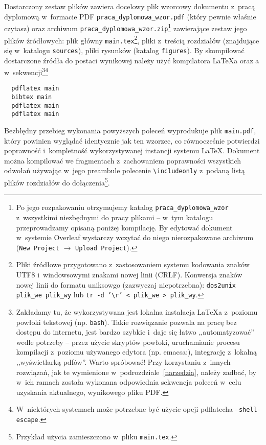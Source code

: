 Dostarczony zestaw plików zawiera docelowy plik wzorcowy dokumentu z~pracą dyplomową w~formacie PDF \texttt{praca\_dyplomowa\_wzor.pdf} (który pewnie właśnie czytasz) oraz archiwum \texttt{praca\_dyplomowa\_wzor.zip}\footnote{Po jego rozpakowaniu otrzymujemy katalog \texttt{praca\_dyplomowa\_wzor} z~wszystkimi niezbędnymi do pracy plikami -- w~tym katalogu przeprowadzamy opisaną poniżej kompilację. By edytować dokument w~systemie Overleaf wystarczy wczytać do niego nierozpakowane archiwum (\texttt{New Project} $\rightarrow$ \texttt{Upload Project}).} zawierające zestaw jego plików źródłowych: plik główny \texttt{main.tex}\footnote{Pliki źródłowe przygotowano z~zastosowaniem systemu kodowania znaków UTF8 i~windowsowymi znakami nowej linii (CRLF). Konwersja znaków nowej linii do formatu uniksowgo (zazwyczaj niepotrzebna): \texttt{dos2unix plik\_we plik\_wy} lub \texttt{tr -d '\textbackslash r' < plik\_we > plik\_wy}.}, pliki z~treścią rozdziałów (znajdujące się w~katalogu \texttt{sources}), pliki rysunków (katalog \texttt{figures}). By skompilować dostarczone źródła do postaci wynikowej należy użyć kompilatora \LaTeX{}a oraz \BibTeX{}a w~sekwencji\footnote{Zakładamy tu, że wykorzystywana jest lokalna instalacja \LaTeX{}a z~poziomu powłoki tekstowej (np. \texttt{bash}). Takie rozwiązanie pozwala na pracę bez dostępu do internetu, jest bardzo szybkie i~daje się łatwo ,,automatyzować'' wedle potrzeby -- przez użycie skryptów powłoki, uruchamianie procesu kompilacji z~poziomu używanego edytora (np. emacsa:), integrację z~lokalną ,,wyświetlarką pdfów''. Warto spróbować! Przy korzystaniu z~innych rozwiązań, jak te wymienione w~podrozdziale~\ref{narzedzia}, należy zadbać, by w~ich ramach została wykonana odpowiednia sekwencja poleceń w~celu uzyskania aktualnego, wynikowego pliku PDF.}\footnote{W~niektórych systemach może potrzebne być użycie opcji pdflatecha \texttt{--shell-escape}.}\vspace{-3mm}
\begin{verbatim}
  pdflatex main
  bibtex main
  pdflatex main
  pdflatex main
\end{verbatim}
Bezbłędny przebieg wykonania powyższych poleceń wyprodukuje plik \texttt{main.pdf}, który powinien wyglądać identycznie jak ten wzorzec, co równocześnie potwierdzi poprawność i~kompletność wykorzystywanej instancji systemu \LaTeX. Dokument można kompilować we fragmentach z~zachowaniem poprawności wszystkich odwołań używając w~jego preambule polecenie \texttt{\textbackslash includeonly} z~podaną listą plików rozdziałów do dołączenia\footnote{Przykład użycia zamieszczono w~pliku \texttt{main.tex}.}.

